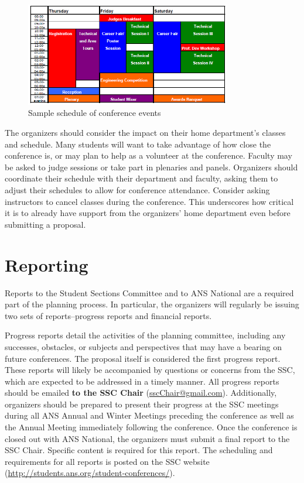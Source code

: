 \documentclass[12pt]{article}
\begin{document}
\begin{figure}[h]
    \centering
    \includegraphics[width=0.8\textwidth]{SampSched.PNG}
    \caption{Sample schedule of conference events}
    \label{fig:Schedule}
\end{figure}


The organizers should consider the impact on their home department's classes and schedule.
Many students will want to take advantage of how close the conference is, or may plan to help as a volunteer at the conference.
Faculty may be asked to judge sessions or take part in plenaries and panels.
Organizers should coordinate their schedule with their department and faculty, asking them to adjust their schedules to allow for conference attendance.
Consider asking instructors to cancel classes during the conference.
This underscores how critical it is to already have support from the organizers' home department even before submitting a proposal.

\clearpage
\section{Reporting}
Reports to the Student Sections Committee and to ANS National are a required part of the planning process.
In particular, the organizers will regularly be issuing two sets of reports\---progress reports and financial reports.

Progress reports detail the activities of the planning committee, including any successes, obstacles, or subjects and perspectives that may have a bearing on future conferences.
The proposal itself is considered the first progress report.
These reports will likely be accompanied by questions or concerns from the SSC, which are expected to be addressed in a timely manner.
All progress reports should be emailed \textbf{to the SSC Chair} (\href{mailto:sscChair@gmail.com}{sscChair@gmail.com}).
Additionally, organizers should be prepared to present their progress at the SSC meetings during all ANS Annual and Winter Meetings preceding the conference as well as the Annual Meeting immediately following the conference.
Once the conference is closed out with ANS National, the organizers must submit a final report to the SSC Chair.
Specific content is required for this report.
The scheduling and requirements for all reports is posted on the SSC website (\href{http://students.ans.org/student-conferences/}{http://students.ans.org/student-conferences/}).
\end{document}

